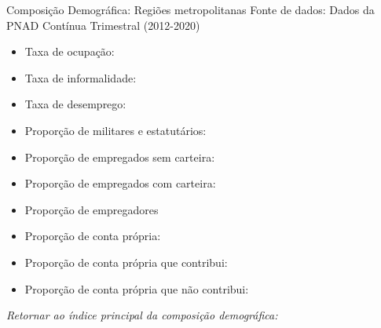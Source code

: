 \begin{frame}[label=_composicao_demografica_regiao_metro]{Composição Demográfica: Regiões metropolitanas}
{\footnotesize Fonte de dados: Dados da PNAD Contínua Trimestral (2012-2020)}
\begin{itemize}
\item{Taxa de ocupação: \hyperlink{_composicao_demografica_regiao_metro_taxa_de_ocupacao}{}}
\item{Taxa de informalidade: \hyperlink{_composicao_demografica_regiao_metro_taxa_de_informalidade}{}}
\item{Taxa de desemprego: \hyperlink{_composicao_demografica_regiao_metro_taxa_de_desemprego}{}}
\item{Proporção de militares e estatutários: \hyperlink{_composicao_demografica_regiao_metro_prop_militar}{}}
\item{Proporção de empregados sem carteira: \hyperlink{_composicao_demografica_regiao_metro_prop_empregadoSC}{}}
\item{Proporção de empregados com carteira: \hyperlink{_composicao_demografica_regiao_metro_prop_empregadoCC}{}}
\item{Proporção de empregadores \hyperlink{_composicao_demografica_regiao_metro_prop_empregador}{}}
\item{Proporção de conta própria: \hyperlink{_composicao_demografica_regiao_metro_prop_cpropria}{}}
\item{Proporção de conta própria que contribui: \hyperlink{_composicao_demografica_regiao_metro_prop_cpropriaC}{}}
\item{Proporção de conta própria que não contribui: \hyperlink{_composicao_demografica_regiao_metro_prop_cpropriaNc}{}}
\end{itemize}

\begin{small}
\textit{Retornar ao índice principal da composição demográfica: \hyperlink{_composicao_demografica}{} }
\end{small}

\end{frame}

